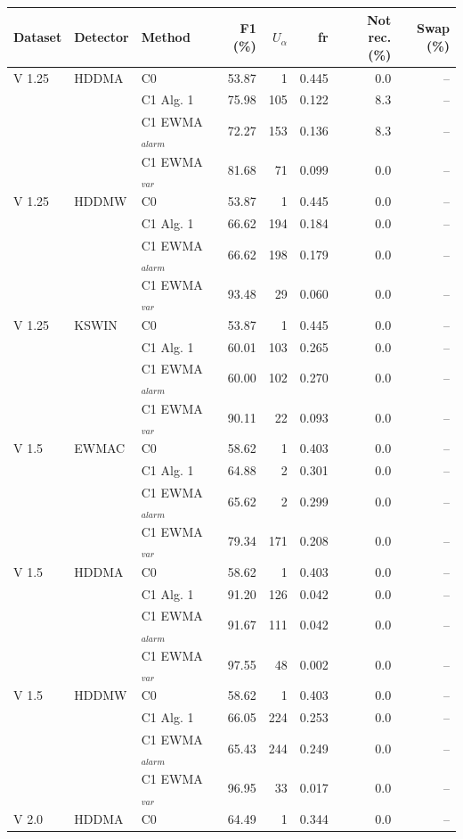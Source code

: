 \begin{longtable}{lllrrrrr}
\hline
Dataset & Detector & Method & F1 (\%) & $U_\alpha$ & fr & Not rec. (\%) & Swap (\%) \\ \hline
\endhead
V  1.25 & HDDMA & C0 & 53.87 & 1 & 0.445 & 0.0 & -- \\
 &  & C1 Alg. 1 & 75.98 & 105 & 0.122 & 8.3 & -- \\
 &  & C1 EWMA$_{alarm}$ & 72.27 & 153 & 0.136 & 8.3 & -- \\
 &  & C1 EWMA$_{var}$ & 81.68 & 71 & 0.099 & 0.0 & -- \\
\hline
V  1.25 & HDDMW & C0 & 53.87 & 1 & 0.445 & 0.0 & -- \\
 &  & C1 Alg. 1 & 66.62 & 194 & 0.184 & 0.0 & -- \\
 &  & C1 EWMA$_{alarm}$ & 66.62 & 198 & 0.179 & 0.0 & -- \\
 &  & C1 EWMA$_{var}$ & 93.48 & 29 & 0.060 & 0.0 & -- \\
\hline
V  1.25 & KSWIN & C0 & 53.87 & 1 & 0.445 & 0.0 & -- \\
 &  & C1 Alg. 1 & 60.01 & 103 & 0.265 & 0.0 & -- \\
 &  & C1 EWMA$_{alarm}$ & 60.00 & 102 & 0.270 & 0.0 & -- \\
 &  & C1 EWMA$_{var}$ & 90.11 & 22 & 0.093 & 0.0 & -- \\
\hline
V  1.5 & EWMAC & C0 & 58.62 & 1 & 0.403 & 0.0 & -- \\
 &  & C1 Alg. 1 & 64.88 & 2 & 0.301 & 0.0 & -- \\
 &  & C1 EWMA$_{alarm}$ & 65.62 & 2 & 0.299 & 0.0 & -- \\
 &  & C1 EWMA$_{var}$ & 79.34 & 171 & 0.208 & 0.0 & -- \\
\hline
V  1.5 & HDDMA & C0 & 58.62 & 1 & 0.403 & 0.0 & -- \\
 &  & C1 Alg. 1 & 91.20 & 126 & 0.042 & 0.0 & -- \\
 &  & C1 EWMA$_{alarm}$ & 91.67 & 111 & 0.042 & 0.0 & -- \\
 &  & C1 EWMA$_{var}$ & 97.55 & 48 & 0.002 & 0.0 & -- \\
\hline
V  1.5 & HDDMW & C0 & 58.62 & 1 & 0.403 & 0.0 & -- \\
 &  & C1 Alg. 1 & 66.05 & 224 & 0.253 & 0.0 & -- \\
 &  & C1 EWMA$_{alarm}$ & 65.43 & 244 & 0.249 & 0.0 & -- \\
 &  & C1 EWMA$_{var}$ & 96.95 & 33 & 0.017 & 0.0 & -- \\
\hline
V  2.0 & HDDMA & C0 & 64.49 & 1 & 0.344 & 0.0 & -- \\

\end{longtable}
